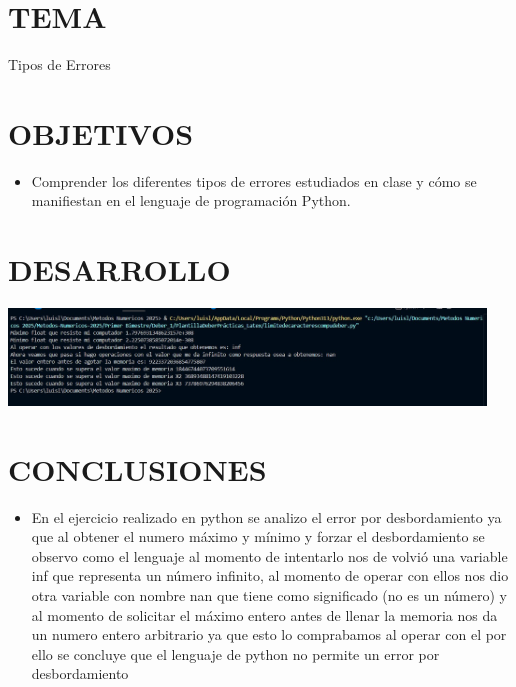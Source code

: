 \documentclass[12pt]{article}
\begin{document}
\section*{TEMA}
{Tipos de Errores}

\vspace{0.5cm}

\section*{OBJETIVOS}
\begin{itemize}
    \item {Comprender los diferentes tipos de errores estudiados en clase y cómo se manifiestan en el lenguaje de programación Python. }
\end{itemize}

\vspace{0.5cm}

\section*{DESARROLLO}
\begin{minipage}{0.85\textwidth}
    \raggedleft
    \includegraphics[width=0.95\textwidth]{inFiles/Figures/ej.jpg}
\end{minipage}

\vspace{0.5cm}

\section*{CONCLUSIONES}
\begin{itemize}
    \item { En el ejercicio realizado en python se analizo el error por desbordamiento ya que al obtener el numero máximo y mínimo
    y forzar el desbordamiento se observo como el lenguaje al momento de intentarlo nos de volvió una variable inf que representa un número infinito, al momento de operar con ellos nos dio
    otra variable con nombre nan que tiene como significado (no es un 
    número) y al momento de solicitar el máximo entero antes de llenar la memoria nos da un numero entero arbitrario ya que esto lo comprabamos al operar con el por ello se concluye que el lenguaje de python no permite un error por desbordamiento}
\end{itemize}


\vspace{0.5cm}
\end{document}
